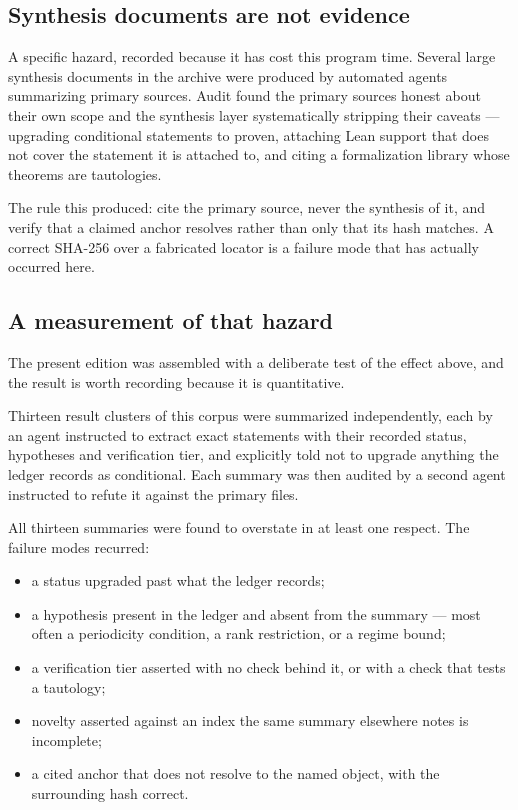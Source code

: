 \subsection{Synthesis documents are not evidence}

A specific hazard, recorded because it has cost this program time. Several
large synthesis documents in the archive were produced by automated
agents summarizing primary sources. Audit found the primary sources
honest about their own scope and the synthesis layer systematically
stripping their caveats --- upgrading conditional statements to proven,
attaching Lean support that does not cover the statement it is attached
to, and citing a formalization library whose theorems are tautologies.

The rule this produced: cite the primary source, never the synthesis of
it, and verify that a claimed anchor resolves rather than only that its
hash matches. A correct SHA-256 over a fabricated locator is a failure
mode that has actually occurred here.

\subsection{A measurement of that hazard}

The present edition was assembled with a deliberate test of the effect
above, and the result is worth recording because it is quantitative.

Thirteen result clusters of this corpus were summarized independently,
each by an agent instructed to extract exact statements with their
recorded status, hypotheses and verification tier, and explicitly told
not to upgrade anything the ledger records as conditional. Each summary
was then audited by a second agent instructed to refute it against the
primary files.

All thirteen summaries were found to overstate in at least one respect.
The failure modes recurred:

\begin{itemize}
  \item a status upgraded past what the ledger records;
  \item a hypothesis present in the ledger and absent from the summary
    --- most often a periodicity condition, a rank restriction, or a
    regime bound;
  \item a verification tier asserted with no check behind it, or with a
    check that tests a tautology;
  \item novelty asserted against an index the same summary elsewhere
    notes is incomplete;
  \item a cited anchor that does not resolve to the named object, with
    the surrounding hash correct.
\end{itemize}

